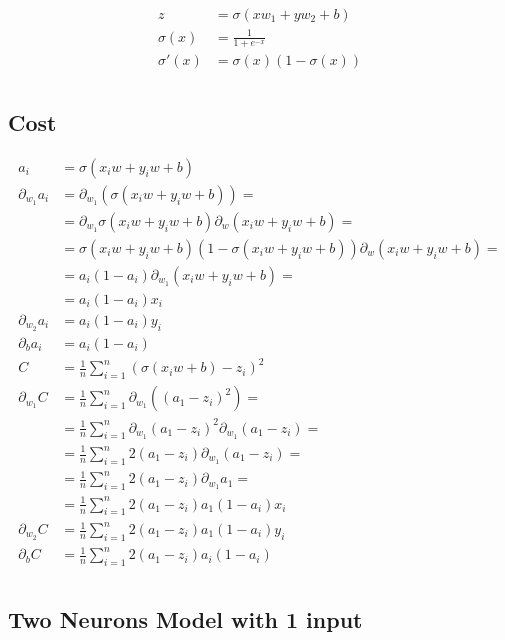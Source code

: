\documentclass{article}
\begin{document}
    \begin{align}
        z &= \sigma(xw_1 + yw_2 + b) \\
        \sigma(x) &= \frac{1}{1 + e^{-x}} \\
        \sigma'(x) &= \sigma(x)(1 - \sigma(x)) \\
     \end{align}

     \subsection{Cost}

     \def\pd[#1]{\partial_{#1}}
     \def\avgsum[#1,#2]{\frac{1}{#2}\sum_{#1=1}^{#2}}
     \begin{align}
         a_i
            &= \sigma(x_iw + y_iw + b) \\
         \pd[w_1]a_i
            &= \pd[w_1](\sigma(x_iw + y_iw + b)) =\\
            &= \pd[w_1]\sigma(x_iw + y_iw + b)\pd[w](x_iw + y_iw + b) =\\
            &= \sigma(x_iw + y_iw + b)(1 - \sigma(x_iw + y_iw + b))\pd[w](x_iw + y_iw + b) =\\
            &= a_i(1 - a_i)\pd[w_1](x_iw + y_iw + b) =\\
            &= a_i(1 - a_i)x_i \\
         \pd[w_2]a_i
         	&= a_i(1 - a_i)y_i \\
         \pd[b]a_i
         	&= a_i(1 - a_i) \\
         C
         	&= \avgsum[i,n](\sigma(x_iw+b)-z_i)^2 \\
         \pd[w_1]C
            &= \avgsum[i,n]\pd[w_1]\left((a_1 - z_i)^2\right) =\\
            &= \avgsum[i,n]\pd[w_1](a_1 - z_i)^2\pd[w_1](a_1 - z_i) =\\
            &= \avgsum[i,n]2(a_1 - z_i)\pd[w_1](a_1 - z_i) =\\ %
            &= \avgsum[i,n]2(a_1 - z_i)\pd[w_1]a_1 =\\
            &= \avgsum[i,n]2(a_1 - z_i)a_1(1 - a_i)x_i \\
         \pd[w_2]C
            &= \avgsum[i,n]2(a_1 - z_i)a_1(1 - a_i)y_i \\
         \pd[b]C
            &= \avgsum[i,n]2(a_1 - z_i)a_i(1 - a_i) \\
     \end{align}

    \newpage
    \subsection{Two Neurons Model with 1 input}
\end{document}
